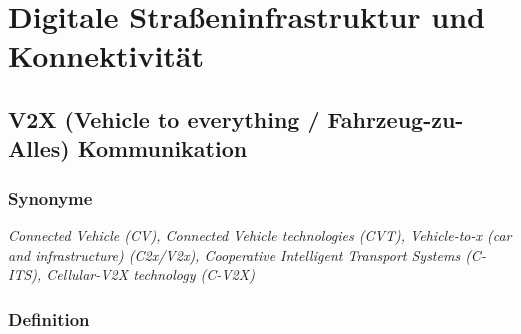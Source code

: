 \documentclass[
]{book}
\begin{document}
\hypertarget{digital}{%
\chapter{Digitale Straßeninfrastruktur und Konnektivität}\label{digital}}

\hypertarget{v2x}{%
\section{V2X (Vehicle to everything / Fahrzeug-zu-Alles) Kommunikation}\label{v2x}}

\hypertarget{synonyme-16}{%
\subsection*{Synonyme}\label{synonyme-16}}

\emph{Connected Vehicle (CV), Connected Vehicle technologies (CVT), Vehicle-to-x (car and infrastructure) (C2x/V2x), Cooperative Intelligent Transport Systems (C-ITS), Cellular-V2X technology (C-V2X)}

\hypertarget{definition-18}{%
\subsection*{Definition}\label{definition-18}}
\end{document}
